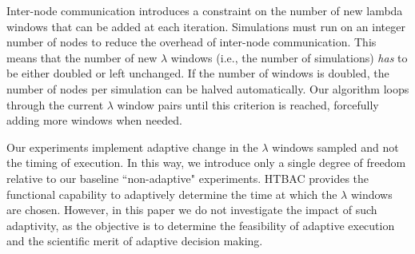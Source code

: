 Inter-node communication introduces a constraint on the number of new lambda
windows that can be added at each iteration. Simulations must run on an
integer number of nodes to reduce the overhead of inter-node communication.
This means that the number of new $\lambda$ windows (i.e., the number of
simulations) \emph{has} to be either doubled or left unchanged. If the number
of windows is doubled, the number of nodes per simulation can be halved
automatically. Our algorithm loops through the current $\lambda$ window pairs
until this criterion is reached, forcefully adding more windows when needed.




Our experiments implement adaptive change in the $\lambda$ windows sampled
and not the timing of execution. In this way, we introduce only a single
 degree of freedom relative to  our
baseline ``non-adaptive" experiments. HTBAC provides the functional
capability to adaptively determine the time at which the $\lambda$ windows
are chosen. However, in this paper we do not investigate the impact of such
adaptivity, as the objective is to determine the feasibility of adaptive
execution and the scientific merit of adaptive decision making.


